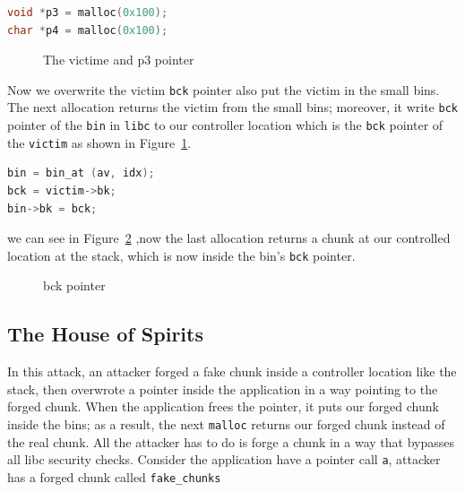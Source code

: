 \documentclass{masterthesis}
\newcommand*\sbs{small bins}
\newcommand*\mallocc{\lstinline{malloc}\xspace}
\begin{document}
\begin{lstlisting}[language=c,frame=tlrb]
void *p3 = malloc(0x100);
char *p4 = malloc(0x100);
\end{lstlisting}

\begin{figure}[h!]
\caption{The victime and p3 pointer}
\label{fig:gdb4}
\end{figure}

Now we overwrite the victim \lstinline{bck} pointer also put the victim in the \sbs{}. The next allocation returns the victim from the \sbs{}; moreover, it write \lstinline{bck} pointer of the \lstinline{bin} in \lstinline{libc} to our controller location which is the \lstinline{bck} pointer of the \lstinline{victim} as shown in Figure~\ref{fig:gdb4}.

\begin{lstlisting}[language=c,frame=tlrb]
bin = bin_at (av, idx);
bck = victim->bk;
bin->bk = bck;
\end{lstlisting}

we can see in Figure~\ref{fig:gdb5} ,now the last allocation returns a chunk at our controlled location at the stack, which is now inside the bin's \lstinline{bck} pointer.

\begin{figure}[h!]
\caption{bck pointer}
\label{fig:gdb5}
\end{figure}

\subsection{The House of Spirits}
\label{subsect:housespirits}
In this attack, an attacker forged a fake chunk inside a controller location like the stack, then overwrote a pointer inside the application in a way pointing to the forged chunk. When the application frees the pointer, it puts our forged chunk inside the bins; as a result, the next \mallocc{} returns our forged chunk instead of the real chunk. All the attacker has to do is forge a chunk in a way that bypasses all libc security checks. Consider the application have a pointer call \lstinline{a}, attacker has a forged chunk called \lstinline{fake_chunks}
\end{document}
